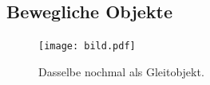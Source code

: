 \documentclass[11pt,a4paper]{article} %
\begin{document}
\subsection{Bewegliche Objekte}
\label{Floats}


\begin{figure}[h]
\begin{center}
\texttt{[image: bild.pdf]}
\caption{Dasselbe nochmal als Gleitobjekt. \label{bild}}
\end{center}
\end{figure}
\newpage
\newpage
\begin{center}


\end{center}
\end{document}
